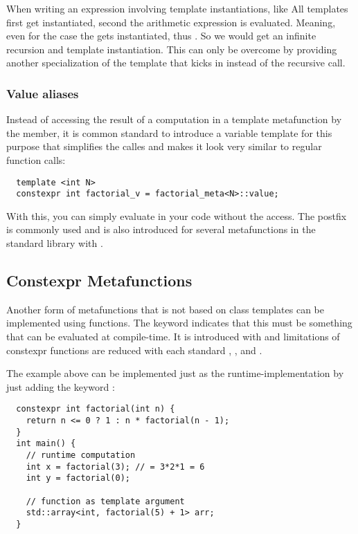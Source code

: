 \begin{rem}
  When writing an expression involving template instantiations, like
  All templates first get instantiated, second the arithmetic expression is evaluated. Meaning, even for the case  the
   gets instantiated, thus . So we would get an infinite recursion and template instantiation.
  This can only be overcome by providing another specialization of the template that kicks in instead of the recursive call.
\end{rem}


\subsubsection{Value aliases}
Instead of accessing the result of a computation in a template metafunction by the  member, it is common standard to
introduce a variable template for this purpose that simplifies the calles and makes it look very similar to regular function calls:
%
\begin{verbatim}
  template <int N>
  constexpr int factorial_v = factorial_meta<N>::value;
\end{verbatim}
%
With this, you can simply evaluate  in your code without the  access. The postfix  is commonly used
and is also introduced for several metafunctions in the standard library with .


\subsection{Constexpr Metafunctions}
Another form of metafunctions that is not based on class templates can be implemented using  functions. The keyword
 indicates that this must be something that can be evaluated at compile-time. It is introduced with  and limitations
of constexpr functions are reduced with each standard , , and .

The example above can be implemented just as the runtime-implementation by just adding the keyword :
\begin{verbatim}
  constexpr int factorial(int n) {
    return n <= 0 ? 1 : n * factorial(n - 1);
  }
  int main() {
    // runtime computation
    int x = factorial(3); // = 3*2*1 = 6
    int y = factorial(0);

    // function as template argument
    std::array<int, factorial(5) + 1> arr;
  }
\end{verbatim}

